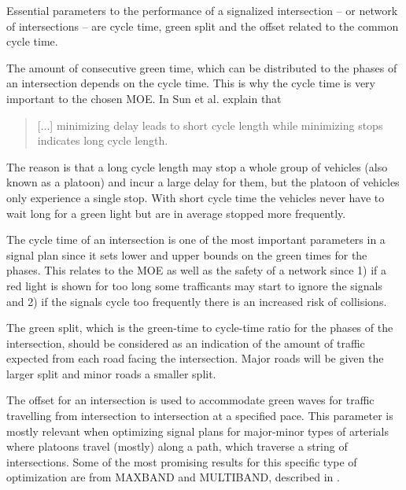 \label{sec:theproblem}

Essential parameters to the performance of a signalized intersection
-- or network of intersections -- are cycle time, green split and the
offset related to the common cycle time.

The amount of consecutive green time, which can be distributed to the
phases of an intersection depends on the cycle time. This is why the
cycle time is very important to the chosen MOE. In \cite{41} Sun et
al. explain that 

\begin{quote}[...] minimizing delay leads to short cycle length while
minimizing stops indicates long cycle length.
\end{quote}

The reason is that a long cycle length may stop a whole group of
vehicles (also known as a platoon) and incur a large delay for them,
but the platoon of vehicles only experience a single stop. With short
cycle time the vehicles never have to wait long for a green light but
are in average stopped more frequently.


The cycle time of an intersection is one of the most important
parameters in a signal plan since it sets  lower and upper bounds on
the green times for the phases. This relates to the MOE as well as the
safety of a network since 1) if a red light is shown for too long some
trafficants may start to ignore the signals and 2) if the signals
cycle too frequently there is an increased risk of collisions.

The green split, which is the green-time to cycle-time ratio for the
phases of the intersection, should be considered as an indication of
the amount of traffic expected from each road facing the
intersection. Major roads will be given the larger split and minor
roads a smaller split.

The offset for an intersection is used to accommodate green waves for
traffic travelling from intersection to intersection at a specified
pace. This parameter is mostly relevant when optimizing signal plans
for major-minor types of arterials where platoons travel (mostly)
along a path, which traverse a string of intersections. Some of the
most promising results for this specific type of optimization are from
MAXBAND and MULTIBAND, described in \cite{37}.

